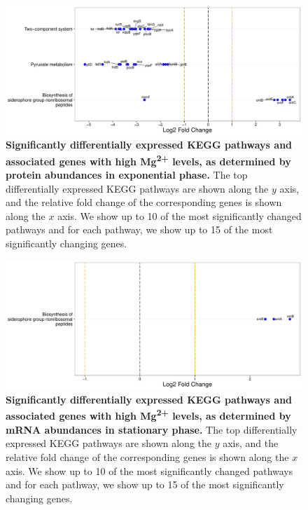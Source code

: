 \documentclass[a4paper]{article}
\begin{document}
\clearpage
\begin{figure}
	\includegraphics[width=1.0\textwidth]{../../d_figures/kegg_11.pdf}
	\caption[Significantly differentially expressed KEGG pathways for protein samples in exponential phase tested for high Mg\textsuperscript{2+} against base Mg\textsuperscript{2+}]
	{\textbf{Significantly differentially expressed KEGG pathways and associated genes with high Mg\textsuperscript{2+} levels, as determined by protein abundances in exponential phase.} The top differentially expressed KEGG pathways are shown along the $y$ axis, and the relative fold change of the corresponding genes is shown along the $x$ axis. We show up to 10 of the most significantly changed pathways and for each pathway, we show up to 15 of the most significantly changing genes.}
\end{figure}

\clearpage
\begin{figure}
	\includegraphics[width=1.0\textwidth]{../../d_figures/kegg_12.pdf}
	\caption[Significantly differentially expressed KEGG pathways for mRNA samples in stationary phase tested for high Mg\textsuperscript{2+} against base Mg\textsuperscript{2+}]
	{\textbf{Significantly differentially expressed KEGG pathways and associated genes with high Mg\textsuperscript{2+} levels, as determined by mRNA abundances in stationary phase.} The top differentially expressed KEGG pathways are shown along the $y$ axis, and the relative fold change of the corresponding genes is shown along the $x$ axis. We show up to 10 of the most significantly changed pathways and for each pathway, we show up to 15 of the most significantly changing genes.}
\end{figure}
\end{document}
